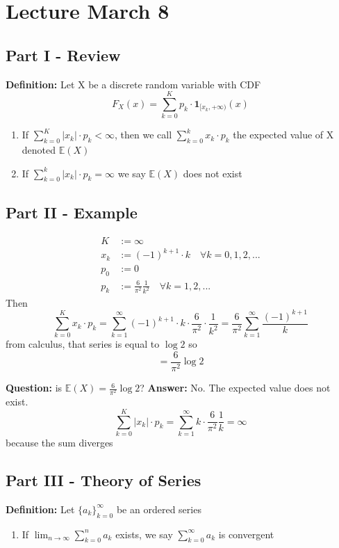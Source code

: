 \documentclass[12pt]{article}
\begin{document}
\section{Lecture March 8}
\subsection*{Part I - Review}
\textbf{Definition:} Let X be a discrete random variable with CDF 
\[F_X(x) = \sum_{k=0}^K p_k \cdot \mathbf{1}_{[x_k, +\infty)}(x)\]
\begin{enumerate}
    \item If $\sum_{k=0}^K |x_k| \cdot p_k < \infty$, then we call $\sum_{k=0}^k x_k \cdot p_k$ the expected value of X denoted $\mathbb{E}(X)$
    \item If $\sum_{k=0}^k |x_k| \cdot p_k = \infty$ we say $\mathbb{E}(X)$ does not exist 
\end{enumerate}

\subsection*{Part II - Example}
\begin{align*}
    K &:= \infty\\
    x_k &:= (-1)^{k + 1}\cdot k \quad \forall k = 0, 1, 2, ...\\
    p_0 &:=0\\
    p_k &:= \frac{6}{\pi^2} \frac{1}{k^2} \quad \forall k = 1, 2, ...
\end{align*}
Then 
\[\sum_{k=0}^K x_k \cdot p_k = \sum_{k=1}^\infty (-1)^{k + 1} \cdot k \cdot \frac{6}{\pi^2} \cdot \frac{1}{k^2} = \frac{6}{\pi^2}\sum_{k=1}^\infty \frac{(-1)^{k+1}}{k}\]
from calculus, that series is equal to $\log 2$ so 
\[= \frac{6}{\pi^2} \log 2\]

\textbf{Question:} is $\mathbb{E}(X) = \frac{6}{\pi^2} \log 2$? 
\textbf{Answer:} No. The expected value does not exist. 
\[\sum_{k = 0}^K |x_k| \cdot p_k = \sum_{k=1}^\infty k \cdot \frac{6}{\pi^2}\frac{1}{k} = \infty\]
because the sum diverges 

\subsection*{Part III - Theory of Series}
\textbf{Definition:} Let $\{a_k\}_{k=0}^\infty$ be an ordered series
\begin{enumerate}
    \item If $\lim_{n\to \infty}\sum_{k=0}^n a_k$ exists, we say $\sum_{k=0}^\infty a_k$ is convergent
\end{enumerate}
\end{document}
